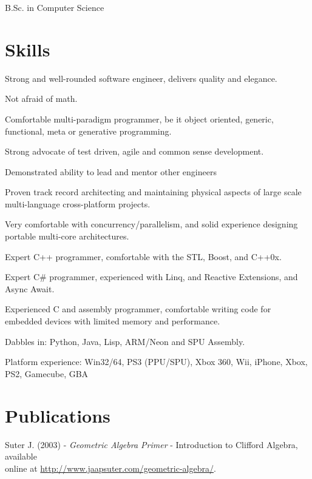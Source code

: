 \documentclass[margin, line]{resume}
\begin{document}
\begin{resume}
B.Sc. in Computer Science

\section{\sc Skills}
\begin{list3}
\item Strong and well-rounded software engineer, delivers quality and elegance.
\item Not afraid of math.
\item Comfortable multi-paradigm programmer, be it object oriented, generic, functional, meta or generative programming.
\item Strong advocate of test driven, agile and common sense development.
\item Demonstrated ability to lead and mentor other engineers
\item Proven track record architecting and maintaining physical aspects of large scale multi-language cross-platform projects.
\item Very comfortable with concurrency/parallelism, and solid experience designing portable multi-core architectures.
\item Expert C++ programmer, comfortable with the STL, Boost, and C++0x.
\item Expert C\# programmer, experienced with Linq, and Reactive Extensions, and Async Await.
\item Experienced C and assembly programmer, comfortable writing code for embedded devices with limited memory and performance.
\item Dabbles in: Python, Java, Lisp, ARM/Neon and SPU Assembly.
\item Platform experience: Win32/64, PS3 (PPU/SPU), Xbox 360, Wii, iPhone, Xbox, PS2, Gamecube, GBA
\end{list3}

\section{\sc Publications}
Suter J. (2003) - \textsl{Geometric Algebra Primer} - Introduction to Clifford Algebra, available\\ online at \url{http://www.jaapsuter.com/geometric-algebra/}.


\end{resume}
\end{document}
